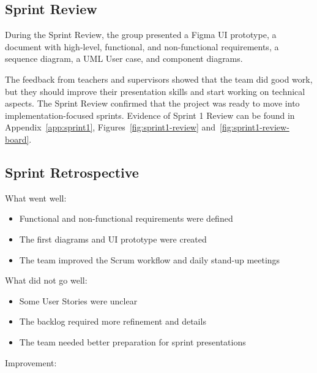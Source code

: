  

\subsection*{Sprint Review}

During the Sprint Review, the group presented a Figma UI prototype, a document with high-level, functional, and non-functional requirements, a sequence diagram, a UML User case, and component diagrams.


The feedback from teachers and supervisors showed  that the team did good work, but they should improve their presentation skills and start working on technical aspects. The Sprint Review confirmed that the project was ready to move into implementation-focused sprints. Evidence of Sprint 1 Review can be found in Appendix~\ref{app:sprint1}, Figures~\ref{fig:sprint1-review} and~\ref{fig:sprint1-review-board}.

 

\subsection*{Sprint Retrospective}

What went well:

\begin{itemize}

 \item Functional and non-functional requirements were defined

 \item The first diagrams and UI prototype were created

 \item The team improved the Scrum workflow and daily stand-up meetings

\end{itemize}


What did not go well:

\begin{itemize}
    \item Some User Stories were unclear

    \item The backlog required more refinement and details

    \item The team needed better preparation for sprint presentations

\end{itemize}

Improvement:

